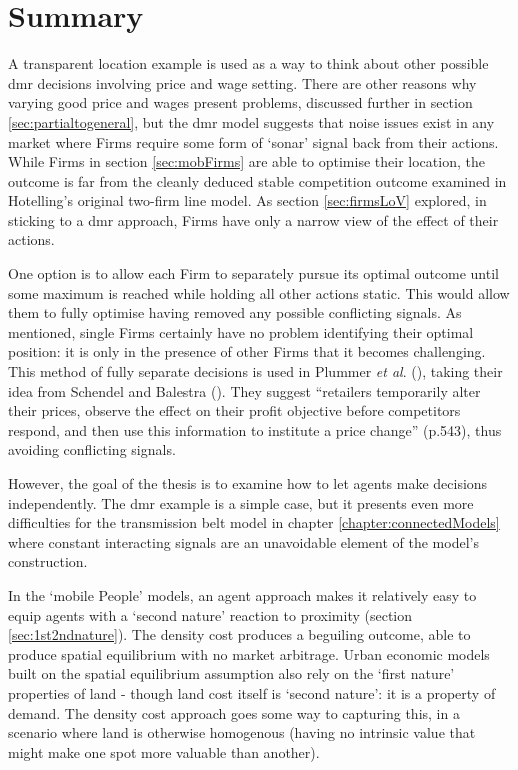 \section{Summary \label{sec:partialconcs}}

A transparent location example is used as a way to think about other possible \gls{dmr} decisions involving price and wage setting. There are other reasons why varying good price and wages present problems, discussed further in section \ref{sec:partialtogeneral}, but the \gls{dmr} model suggests that noise issues exist in any market where Firms require some form of `sonar' signal back from their actions. While Firms in section \ref{sec:mobFirms} are able to optimise their location, the outcome is far from the cleanly deduced stable competition outcome examined in Hotelling's original two-firm line model. As section \ref{sec:firmsLoV} explored, in sticking to a \gls{dmr} approach, Firms have only a narrow view of the effect of their actions. 

One option is to allow each Firm to separately pursue its optimal outcome until some maximum is reached while holding all other actions static. This would allow them to fully optimise having removed any possible conflicting signals. As mentioned, single Firms certainly have no problem identifying their optimal position: it is only in the presence of other Firms that it becomes challenging. This method of fully separate decisions is used in Plummer \emph{et al}.  (\citeyear{plummer_rationality_2012}), taking their idea from Schendel and Balestra (\citeyear{schendel_rational_1969}). They suggest ``retailers temporarily alter their prices, observe the effect on their profit objective before competitors respond, and then use this information to institute a price change'' (p.543), thus avoiding conflicting signals.

However, the goal of the thesis is to examine how to let agents make decisions independently. The \gls{dmr} example is a simple case, but it presents even more difficulties for the transmission belt model in chapter \ref{chapter:connectedModels} where constant interacting signals are an unavoidable element of the model's construction. 

In the `mobile People' models, an agent approach makes it relatively easy to equip agents with a `second nature' reaction to proximity (section \ref{sec:1st2ndnature}). The density cost produces a beguiling outcome, able to produce spatial equilibrium with no market arbitrage. Urban economic models built on the spatial equilibrium assumption also rely on the `first nature' properties of land - though land cost itself is `second nature': it is a property of demand. The density cost approach goes some way to capturing this, in a scenario where land is otherwise homogenous (having no intrinsic value that might make one spot more valuable than another). 

